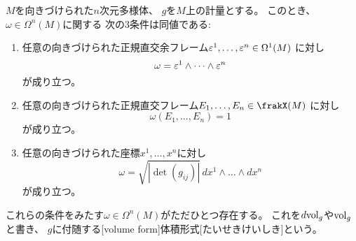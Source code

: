 \documentclass[report]{jlreq}
\begin{document}
%

\begin{propdef}[計量に付随する体積形式]
    $M$を向きづけられた$n$次元多様体、
    $g$を$M$上の計量とする。
    このとき、$\omega \in \Omega^n(M)$に関する
    次の3条件は同値である:
    \begin{enumerate}
        \item 任意の向きづけられた正規直交余フレーム$\varepsilon^1, \dots, \varepsilon^n \in \Omega^1(M)$
            に対し
            \begin{equation}
                \omega = \varepsilon^1 \wedge \dots \wedge \varepsilon^n
            \end{equation}
            が成り立つ。
        \item 任意の向きづけられた正規直交フレーム$E_1, \dots, E_n \in \frakX(M)$
            に対し
            \begin{equation}
                \omega(E_1, \dots, E_n) = 1
            \end{equation}
            が成り立つ。
        \item 任意の向きづけられた座標$x^1, \dots, x^n$に対し
            \begin{equation}
                \omega = \sqrt{|\det (g_{ij})|} \, dx^1 \wedge \dots \wedge dx^n
            \end{equation}
            が成り立つ。
    \end{enumerate}
    これらの条件をみたす$\omega \in \Omega^n(M)$がただひとつ存在する。
    これを$d\mathrm{vol}_g$や$\mathrm{vol}_g$と書き、
    $g$に付随する[volume form]{体積形式}[たいせきけいしき]という。
\end{propdef}
\end{document}
